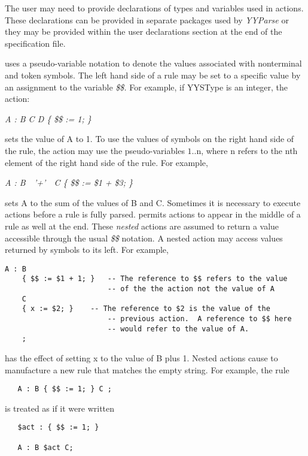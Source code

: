 The user may need to provide declarations of types and variables
used in actions.  These declarations can be provided in separate
packages used by
{\it YYParse}
or they may be provided within the user declarations section at
the end of the specification file.

\ayacc uses a pseudo-variable notation to denote the values
associated with nonterminal and token symbols.  The left hand side
of a rule may be set to a specific value by an assignment to the variable
{\it \$\$.}
For example, if YYSType is an integer, the action:

\begin{center}
{\it A : B C D \{ \$\$ := 1; \}}
\end{center}

\noindent sets the value of A to 1.  To use the values of symbols on
the right hand side of the rule, the action may use the
pseudo-variables $1..$n, where n refers to the nth
element of the right hand side of the rule.  For example,

\begin{center}
{\it A : B\ \ '+'\ \ C \{ \$\$ := \$1 + \$3; \}}
\end{center}

\noindent sets A to the sum of the values of B and C.
\newpage
Sometimes it is necessary to execute actions before a rule is fully
parsed.  \ayacc permits actions to appear in the middle of a rule
as well at the end.  These {\it nested} actions are assumed to return
a value accessible through the usual
{\it \$\$}
notation.  A nested
action may access values returned by symbols to its left.  For
example,
\begin{verbatim}
A : B
    { $$ := $1 + 1; }	-- The reference to $$ refers to the value
                        -- of the the action not the value of A
    C
    { x := $2; }	-- The reference to $2 is the value of the
                        -- previous action.  A reference to $$ here
                        -- would refer to the value of A.
    ;
\end{verbatim}
has the effect of setting x to the value of B plus 1.  Nested actions
cause \ayacc to manufacture a new rule
that matches the  empty string.  For example, the rule
\begin{verbatim}
   A : B { $$ := 1; } C ;
\end{verbatim}
is treated as if it were written
\begin{verbatim}
   $act : { $$ := 1; }

   A : B $act C;
\end{verbatim}
\vspace{-0.3in}\hspace{1.3in}\footnotemark\vspace{0.3in}
